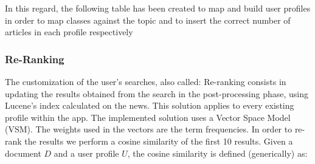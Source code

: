 \documentclass[11pt, english]{article}
\begin{document}
In this regard, the following table has been created to map and build user profiles in order to map classes against the topic and to insert the correct number of articles in each profile respectively

\begin{table}[H]
\centering
{}
\caption{Table with Topics and Interest for every user}
\label{tab:my-table}
\end{table}


\subsubsection{Re-Ranking}

The customization of the user's searches, also called: Re-ranking consists in updating the results obtained from the search in the post-processing phase, using Lucene's index calculated on the news.
\break
This solution applies to every existing profile within the app.
\break
The implemented solution uses a Vector Space Model (VSM). The weights used in the vectors are the term frequencies. In order to re-rank the results we perform a cosine similarity of the first 10 results.
\newline
Given a document $D$ and a user profile $U$, the cosine similarity is defined (generically) as:
\end{document}
